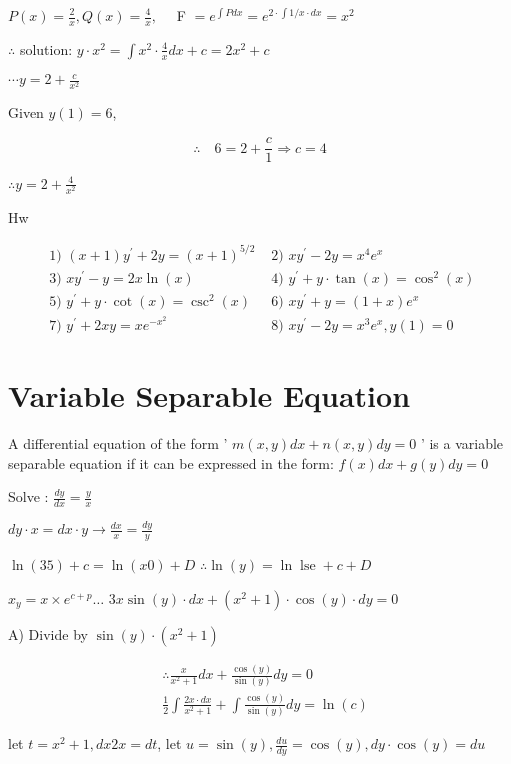 \documentclass[12pt, a4paper]{article}
\begin{document}
$P(x)=\frac{2}{x}, Q(x)=\frac{4}{x}, \quad$ F $=e^{\int P d x}=e^{2 \cdot \int 1 / x \cdot d x}=x^{2}$

$\therefore$ solution: $y \cdot x^{2}=\int x^{2} \cdot \frac{4}{x} d x+c=2 x^{2}+c$

$\cdots y=2+\frac{c}{x^{2}}$

Given $y(1)=6$,

$$
\therefore \quad 6=2+\frac{c}{1} \Rightarrow c=4
$$

$\therefore y=2+\frac{4}{x^{2}}$

Hw

$$
\begin{array}{ll}
\text { 1) }(x+1) y^{\prime}+2 y=(x+1)^{5 / 2} & \text { 2) } x y^{\prime}-2 y=x^{4} e^{x} \\
\text { 3) } x y^{\prime}-y=2 x \ln (x) & \text { 4) } y^{\prime}+y \cdot \tan (x)=\cos ^{2}(x) \\
\text { 5) } y^{\prime}+y \cdot \cot (x)=\csc ^{2}(x) & \text { 6) } x y^{\prime}+y=(1+x) e^{x} \\
\text { 7) } y^{\prime}+2 x y=x e^{-x^{2}} & \text { 8) } x y^{\prime}-2 y=x^{3} e^{x}, y(1)=0
\end{array}
$$

\section*{Variable Separable Equation}
A differential equation of the form ' $m(x, y) d x+n(x, y) d y=0$ ' is a variable separable equation if it can be expressed in the form: $f(x) d x+g(y) d y=0$

Solve : $\frac{d y}{d x}=\frac{y}{x}$

$d y \cdot x=d x \cdot y \rightarrow \frac{d x}{x}=\frac{d y}{y}$


$\ln (35)+c=\ln (x 0)+D$ $\therefore \ln (y)=\ln \operatorname{lse}+c+D$

$x_{y}=x \times e^{c+p} \ldots$ $3 x \sin (y) \cdot d x+\left(x^{2}+1\right) \cdot \cos (y) \cdot d y=0$

A) Divide by $\sin (y) \cdot\left(x^{2}+1\right)$

$$
\begin{aligned}
& \therefore \frac{x}{x^{2}+1} d x+\frac{\cos (y)}{\sin (y)} d y=0 \\
& \frac{1}{2} \int \frac{2 x \cdot d x}{x^{2}+1}+\int \frac{\cos (y)}{\sin (y)} d y=\ln (c)
\end{aligned}
$$

let $t=x^{2}+1, d x 2 x=d t$, let $u=\sin (y), \frac{d u}{d y}=\cos (y), d y \cdot \cos (y)=d u$
\end{document}
